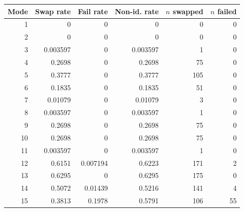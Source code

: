 \begin{tabular}{rrrrrr}
\toprule
Mode & Swap rate & Fail rate & Non-id. rate & $n$ swapped & $n$ failed \\
\midrule
1 & 0 & 0 & 0 & 0 & 0 \\
2 & 0 & 0 & 0 & 0 & 0 \\
3 & 0.003597 & 0 & 0.003597 & 1 & 0 \\
4 & 0.2698 & 0 & 0.2698 & 75 & 0 \\
5 & 0.3777 & 0 & 0.3777 & 105 & 0 \\
6 & 0.1835 & 0 & 0.1835 & 51 & 0 \\
7 & 0.01079 & 0 & 0.01079 & 3 & 0 \\
8 & 0.003597 & 0 & 0.003597 & 1 & 0 \\
9 & 0.2698 & 0 & 0.2698 & 75 & 0 \\
10 & 0.2698 & 0 & 0.2698 & 75 & 0 \\
11 & 0.003597 & 0 & 0.003597 & 1 & 0 \\
12 & 0.6151 & 0.007194 & 0.6223 & 171 & 2 \\
13 & 0.6295 & 0 & 0.6295 & 175 & 0 \\
14 & 0.5072 & 0.01439 & 0.5216 & 141 & 4 \\
15 & 0.3813 & 0.1978 & 0.5791 & 106 & 55 \\
\bottomrule
\end{tabular}
